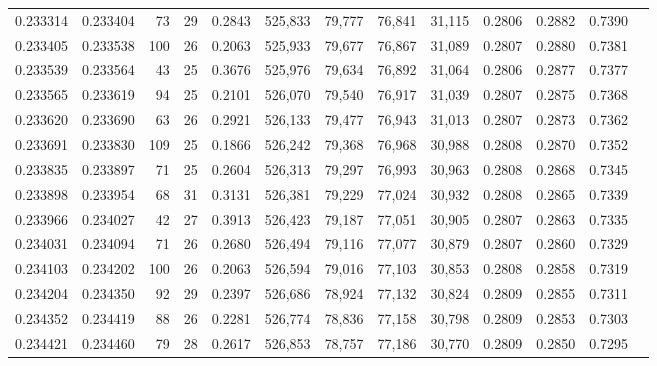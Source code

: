 \begin{tabular}{rrrrrrrrrrrrr}
0.233314 & 0.233404 &  73 &  29 &                                     0.2843 & 525,833 &  79,777 &  76,841 &  31,115 & 0.2806 & 0.2882 & 0.7390 \\
0.233405 & 0.233538 & 100 &  26 &                                     0.2063 & 525,933 &  79,677 &  76,867 &  31,089 & 0.2807 & 0.2880 & 0.7381 \\
0.233539 & 0.233564 &  43 &  25 &                                     0.3676 & 525,976 &  79,634 &  76,892 &  31,064 & 0.2806 & 0.2877 & 0.7377 \\
0.233565 & 0.233619 &  94 &  25 &                                     0.2101 & 526,070 &  79,540 &  76,917 &  31,039 & 0.2807 & 0.2875 & 0.7368 \\
0.233620 & 0.233690 &  63 &  26 &                                     0.2921 & 526,133 &  79,477 &  76,943 &  31,013 & 0.2807 & 0.2873 & 0.7362 \\
0.233691 & 0.233830 & 109 &  25 &                                     0.1866 & 526,242 &  79,368 &  76,968 &  30,988 & 0.2808 & 0.2870 & 0.7352 \\
0.233835 & 0.233897 &  71 &  25 &                                     0.2604 & 526,313 &  79,297 &  76,993 &  30,963 & 0.2808 & 0.2868 & 0.7345 \\
0.233898 & 0.233954 &  68 &  31 &                                     0.3131 & 526,381 &  79,229 &  77,024 &  30,932 & 0.2808 & 0.2865 & 0.7339 \\
0.233966 & 0.234027 &  42 &  27 &                                     0.3913 & 526,423 &  79,187 &  77,051 &  30,905 & 0.2807 & 0.2863 & 0.7335 \\
0.234031 & 0.234094 &  71 &  26 &                                     0.2680 & 526,494 &  79,116 &  77,077 &  30,879 & 0.2807 & 0.2860 & 0.7329 \\
0.234103 & 0.234202 & 100 &  26 &                                     0.2063 & 526,594 &  79,016 &  77,103 &  30,853 & 0.2808 & 0.2858 & 0.7319 \\
0.234204 & 0.234350 &  92 &  29 &                                     0.2397 & 526,686 &  78,924 &  77,132 &  30,824 & 0.2809 & 0.2855 & 0.7311 \\
0.234352 & 0.234419 &  88 &  26 &                                     0.2281 & 526,774 &  78,836 &  77,158 &  30,798 & 0.2809 & 0.2853 & 0.7303 \\
0.234421 & 0.234460 &  79 &  28 &                                     0.2617 & 526,853 &  78,757 &  77,186 &  30,770 & 0.2809 & 0.2850 & 0.7295 \\

\end{tabular}
